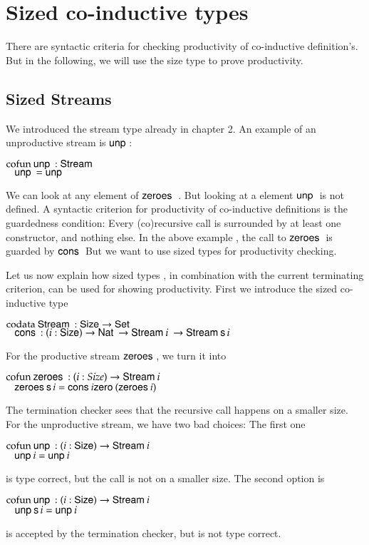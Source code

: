 \section{Sized co-inductive types}


There are syntactic criteria for checking productivity of co-inductive definition's.
But in the following, we will use the size type to prove productivity.

\subsection{Sized Streams}

We introduced the stream type already in chapter 2.
An example of an unproductive stream is $\mathsf{unp}\:$:
\begin{bsp}
$\mathrm{cofun}\: \mathsf{unp}\: : \mathsf{Stream}\: $ \\
$\hspace*{3mm} \mathsf{unp}\: = \mathsf{unp}\:$
\end{bsp}
We can look at any element of $\mathsf{zeroes}\:$ .
But looking at a element $\mathsf{unp}\:$ is not defined. 
A syntactic criterion for productivity of co-inductive definitions is the guardedness condition:
Every (co)recursive call is surrounded by at least one constructor, and nothing else.
In the above example , the call to $\mathsf{zeroes}\:$ is guarded by $\mathsf{cons}\:$
But we want to use sized types for productivity checking.

Let us now explain how sized types , in combination with the current terminating criterion, can be used for showing productivity.
First we introduce the sized co-inductive type 
\begin{bsp}
$\mathrm{codata}\: \mathsf{Stream}\: : \mathsf{Size} \rightarrow \mathsf{Set} $ \\
$\hspace*{3mm} \mathsf{cons}\: : ( i : \mathsf{Size} ) \rightarrow{\mathsf{Nat}\:\rightarrow\mathsf{Stream}\:i \: \rightarrow\mathsf{Stream}\:\mathsf{s}\,i } $
\end{bsp}
For the productive stream $\mathsf{zeroes}\:$, we turn it into
\begin{bsp}
$\mathrm{cofun}\: \mathsf{zeroes}\:: ( i : Size ) \rightarrow{\mathsf{Stream}\:i} $ \\
$\hspace*{3mm} \mathsf{zeroes}\: \mathsf{s}\, i = \mathsf{cons}\: i \mathsf{zero}\: (\mathsf{zeroes}\: i)$\\
\end{bsp}
The termination checker sees that the recursive call happens on a smaller size.
For the unproductive stream, we have two bad choices:
The first one
\begin{bsp}
$\mathrm{cofun}\: \mathsf{unp}\: : ( i : \mathsf{Size} ) \rightarrow{\mathsf{Stream}\:i}$ \\
$\hspace*{3mm} \mathsf{unp}\: i =  \mathsf{unp}\: i$
\end{bsp}
is type correct, but the call is not on a smaller size.
The second option is
\begin{bsp}
$\mathrm{cofun}\: \mathsf{unp}\: : ( i : \mathsf{Size} ) \rightarrow{\mathsf{Stream}\:i}$ \\
$\hspace*{3mm} \mathsf{unp}\: \mathsf{s}\, i = \mathsf{unp}\: i $
\end{bsp}
is accepted by the termination checker, but is not type correct.

